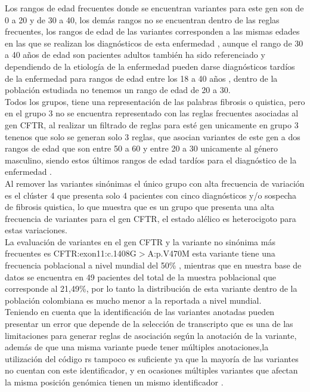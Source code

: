 Los rangos de edad frecuentes donde se encuentran variantes para este gen son de 0 a 20 y de 30 a 40, los demás rangos no se encuentran dentro de las reglas frecuentes, los rangos de edad de las variantes corresponden a las mismas edades en las que se realizan los diagnósticos de esta enfermedad \cite{Terlizzi2017b}, aunque el rango de 30 a 40 años de edad son pacientes adultos también ha sido referenciado y dependiendo de la etiología de la enfermedad pueden darse diagnósticos tardíos de la enfermedad para rangos de edad entre los 18 a 40 años \cite{Farrell2008}, dentro de la población estudiada no tenemos un rango de edad de 20 a 30. \\

Todos los grupos, tiene una representación de las palabras fibrosis o quistica, pero en el grupo 3 no se encuentra representado con las reglas frecuentes asociadas al gen CFTR, al realizar un filtrado de reglas para esté gen unicamente en grupo 3 tenenos que solo se generan solo 3 reglas, que asocian variantes de este gen a dos rangos de edad que son entre 50 a 60 y entre 20 a 30 unicamente al género masculino, siendo estos últimos rangos de edad tardíos para el diagnóstico de la enfermedad \cite{Farrell2008}.\\

Al remover las variantes sinónimas el único grupo con alta frecuencia de variación es el clúster 4 que presenta solo 4 pacientes con cinco diagnósticos y/o sospecha de fibrosis quistica, lo que muestra que es un grupo que presenta una alta frecuencia de variantes para el gen CFTR, el estado alélico es heterocigoto para estas variaciones.\\

La evaluación de variantes en el gen CFTR y la variante no sinónima más frecuentes es CFTR:exon11:c.1408G$>$A:p.V470M esta variante tiene una frecuencia poblacional a nivel mundial del 50\% \cite{Zerbino2018}, mientras que en  nuestra base de datos se encuentra en 49 pacientes del total de la muestra poblacional que corresponde al 21,49\%, por lo tanto la distribución de esta variante dentro de la población colombiana es mucho menor a la reportada a nivel mundial.\\

Teniendo en cuenta que la identificación de las variantes anotadas pueden presentar un error que depende de la selección de transcripto que es una de las limitaciones para generar reglas de asociación según la anotación de la variante, además de que una misma variante puede tener múltiples anotaciones,la utilización del código rs tampoco es suficiente ya que la mayoría de las variantes no cuentan con este identificador, y en ocasiones múltiples variantes que afectan la misma posición genómica tienen un mismo identificador \cite{Liu2016,McCarthy2014}. \\  

